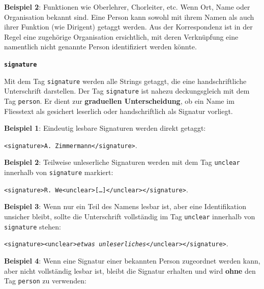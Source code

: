 \documentclass[12pt, a4paper, ngerman, bidi=default]{article}
\begin{document}
\begin{description}
    \textbf{ Beispiel 2}: Funktionen wie Oberlehrer, Chorleiter, etc.
    Wenn Ort, Name oder Organisation bekannt sind. Eine Person kann sowohl mit ihrem Namen als auch ihrer Funktion (wie Dirigent) getaggt werden.  
    Aus der Korrespondenz ist in der Regel eine zugehörige Organisation ersichtlich, mit deren Verknüpfung eine namentlich nicht genannte Person identifiziert werden könnte.

    
    \item \textbf{\colorbox{signature}{\texttt{signature}}}
        
    Mit dem Tag \texttt{\colorbox{signature}{signature}} werden alle Strings getaggt, die eine handschriftliche Unterschrift darstellen.  
    Der Tag \texttt{\colorbox{signature}{signature}} ist nahezu deckungsgleich mit dem Tag \texttt{\colorbox{person}{person}}.  
    Er dient zur \textbf{graduellen Unterscheidung}, ob ein Name im Fliesstext als gesichert leserlich oder handschriftlich als Signatur vorliegt.  
    
    \noindent \textbf{ Beispiel 1}: Eindeutig lesbare Signaturen werden direkt getaggt:  

    \colorbox{VeryLightGray}{\texttt{\textless signature\textgreater A. Zimmermann\textless /signature\textgreater}}. 

    \textbf{ Beispiel 2}: Teilweise unleserliche Signaturen werden mit dem Tag \texttt{\colorbox{unclear}{unclear}} innerhalb von \texttt{\colorbox{signature}{signature}} markiert: 

    \colorbox{VeryLightGray}{\texttt{\textless signature\textgreater R. We\textless unclear\textgreater [\ldots]\textless /unclear\textgreater\textless /signature\textgreater}}. 

    
    \textbf{ Beispiel 3}: Wenn nur ein Teil des Namens lesbar ist, aber eine Identifikation unsicher bleibt, sollte die Unterschrift vollständig im Tag \texttt{\colorbox{unclear}{unclear}} innerhalb von \texttt{\colorbox{signature}{signature}} stehen:

    \colorbox{VeryLightGray}{\texttt{\textless signature\textgreater \textless unclear\textgreater \textit{etwas unleserliches}\textless /unclear\textgreater \textless /signature\textgreater}.} 
    
    \textbf{ Beispiel 4}: Wenn eine Signatur einer bekannten Person zugeordnet werden kann, aber nicht vollständig lesbar ist, bleibt die Signatur erhalten und wird \textbf{ohne} den Tag \texttt{\colorbox{person}{person}} zu verwenden: 


\end{description}
\end{document}

